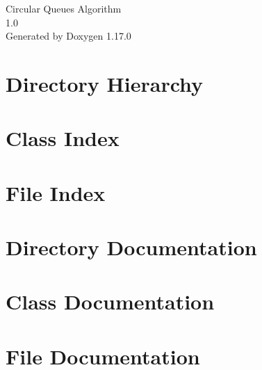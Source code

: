 \documentclass[twoside]{book}
\newcommand{\+}{\discretionary{\mbox{\scriptsize$\hookleftarrow$}}{}{}}
\newcommand{\clearemptydoublepage}{%
    \newpage{\pagestyle{empty}\cleardoublepage}%
  }
\begin{document}
  \raggedbottom
    \hypersetup{pageanchor=false,
                bookmarksnumbered=true,
                pdfencoding=unicode
               }
  \begin{titlepage}
  \vspace*{7cm}
  \begin{center}%
  {\Large Circular Queues Algorithm}\\
  [1ex]\large 1.\+0 \\
  \vspace*{1cm}
  {\large Generated by Doxygen 1.17.0}\\
  \end{center}
  \end{titlepage}
  \clearemptydoublepage
  \tableofcontents
  \clearemptydoublepage
  \hypersetup{pageanchor=true}

\chapter{Directory Hierarchy}

\chapter{Class Index}

\chapter{File Index}

\chapter{Directory Documentation}

\chapter{Class Documentation}

\chapter{File Documentation}

  \backmatter
  \newpage
  \clearemptydoublepage
  \printindex
\end{document}
